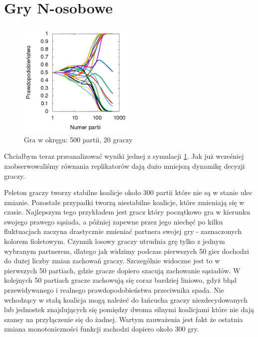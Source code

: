 \section{Gry N-osobowe}
\label{sec:N3zal}
\begin{figure}
    \centering
    \includegraphics[width=0.5\textwidth]{pict/wyniki/g500p20}   
    \caption{Gra w okręgu: 500 partii, 20 graczy}
	\label{fig:podst} 
\end{figure}

Chciałbym teraz przeanalizować wyniki jednej z symulacji \ref{fig:podst}. Jak już wcześniej zaobserwowaliśmy równania replikatorów dają dużo mniejszą dynamikę decyzji graczy.

Peleton graczy tworzy stabilne koalicje około 300 partii które nie są w stanie ulec zmianie. Pozostałe przypadki tworzą niestabilne koalicje, które zmieniają się w czasie. Najlepszym tego przykładem jest gracz który początkowo gra w kierunku swojego prawego sąsiada, a później zapewne przez jego niechęć po kilku fluktuacjach zaczyna drastycznie zmieniać partnera swojej gry - zaznaczonych kolorem fioletowym. Czynnik losowy graczy utrudnia grę tylko z jednym wybranym partnerem, dlatego jak widzimy podczas pierwszych 50 gier dochodzi do dużej liczby zmian zachowań graczy. Szczególnie widoczne jest to w pierwszych 50 partiach, gdzie gracze dopiero szacują zachowanie sąsiadów. W kolejnych 50 partiach gracze zachowują się coraz bardziej liniowo, gdyż błąd przewidywanego i realnego prawdopodobieństwa przeciwnika spada. Nie wchodzący w stałą koalicja mogą należeć do łańcucha graczy niezdecydowanych lub jednostek znajdujących się pomiędzy dwoma silnymi koalicjami które nie dają szansy na przyłączenie się do żadnej. Wartym zauważenia jest fakt że ostatnia zmiana monotoniczności funkcji zachodzi dopiero około 300 gry.

